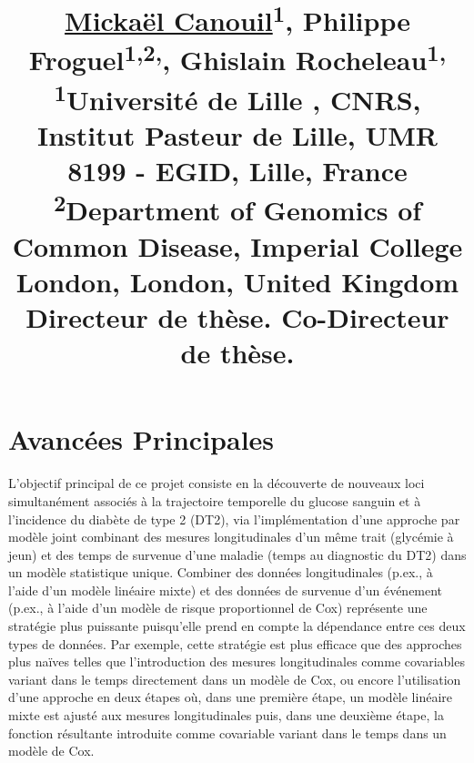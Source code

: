 \documentclass[11pt,a4paper,sans]{moderncv}
\title{\small{\setlength{\parindent}{0cm}\textbf{\underline{Mickaël Canouil}}\textsuperscript{1}, Philippe Froguel\textsuperscript{1,2,\textasteriskcentered}, Ghislain Rocheleau\textsuperscript{1,\textdagger}\\
\normalsize
\textsuperscript{1}Université de Lille , CNRS, Institut Pasteur de Lille, UMR 8199 - EGID, Lille, France\\
\textsuperscript{2}Department of Genomics of Common Disease, Imperial College London, London, United Kingdom\\
\textsuperscript{\textasteriskcentered}Directeur de thèse. \textsuperscript{\textdagger}Co-Directeur de thèse.
}}
\begin{document}
\makecvtitle %

\section{Avancées Principales}
\par{\setlength{\parindent}{0.5cm}
L’objectif principal de ce projet consiste en la découverte de nouveaux loci simultanément associés à la trajectoire temporelle du glucose sanguin et à l’incidence du diabète de type 2 (DT2),
via l'implémentation d'une approche par modèle joint combinant des mesures longitudinales d’un même trait (glycémie à jeun)
et des temps de survenue d’une maladie (temps au diagnostic du DT2) dans un modèle statistique unique\cite{ibrahim_basic_2010, tsiatis_joint_2004}.\newline
Combiner des données longitudinales (p.ex., à l’aide d’un modèle linéaire mixte) et des données de survenue d’un événement (p.ex., à l’aide d’un modèle de risque proportionnel de Cox)
représente une stratégie plus puissante puisqu’elle prend en compte la dépendance entre ces deux types de données.
Par exemple, cette stratégie est plus efficace que des approches plus naïves telles que l’introduction des mesures longitudinales comme covariables variant dans le temps directement dans un modèle de Cox,
ou encore l’utilisation d’une approche en deux étapes\cite{tsiatis_modeling_1995} où, dans une première étape, un modèle linéaire mixte est ajusté aux mesures longitudinales puis, dans une deuxième étape,
la fonction résultante introduite comme covariable variant dans le temps dans un modèle de Cox.}
\vspace{0.5em}
\end{document}

